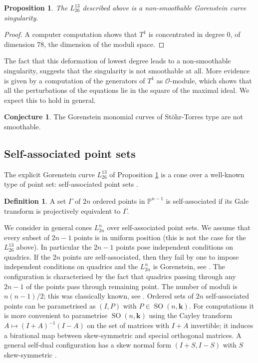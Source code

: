 \documentclass{amsart}
\renewcommand{\P}{\mathbb{P}}
\renewcommand{\k}{\mathbf{k}} %
\newcommand{\mO}{\mathcal{O}}
\newtheorem{prop}[thm]{Proposition}
\theoremstyle{definition}
\newtheorem{defn}[thm]{Definition}
\newtheorem{conj}[thm]{Conjecture}
\theoremstyle{remark}
\begin{document}
\begin{prop}\label{prop:goren}
The $L_{26}^{13}$ described above is a non-smoothable Gorenstein curve singularity.
\end{prop}
\begin{proof}
A computer computation shows that $T^1$ is concentrated in degree 0, of dimension $78$, the dimension of the moduli space.
\end{proof}

The fact  that this deformation of lowest degree 
leads to a non-smoothable singularity, suggests that 
the singularity is not smoothable at all. More evidence is given by a computation of 
the generators of $T^1$ as $\mO$-module, which  shows that
all the perturbations of the equations lie in the square of the maximal ideal. 
We expect this to hold in general.

\begin{conj} 
The Gorenstein monomial curves of Stöhr-Torres type are not smoothable. 
\end{conj}


\subsection{Self-associated point sets}
The explicit Gorenstein curve $L_{26}^{13}$ of Proposition \ref{prop:goren}
is a cone over a well-known type of
 point set: self-associated point sets \cite{Co}. %

\begin{defn} 
A set $\Gamma$ of $2n$ ordered points in $\P^{n-1}$ is self-associated 
if its Gale transform is projectively equivalent to $\Gamma$.
\end{defn}

We consider in general   cones $L_{2n}^n$  over   self-associated point sets.
We assume that every subset of $2n-1$ points is in uniform position (this is not the case
for the $L_{26}^{13}$ above). In particular
 the $2n-1$ points pose independent conditions on quadrics.
If the $2n$ points are self-associated, then they  fail  by one to impose
independent conditions on quadrics and the $L_{2n}^n$
is Gorenstein, see \cite[Sect. 7]{EP}.
The configuration is characterised
by the fact that quadrics passing through any $2n-1$ of the points pass through remaining point.
The number of moduli is $n(n-1)/2$; this was classically known, see \cite[Cor. 8.4]{EP}. 
Ordered sets of $2n$  self-associated points can be parametrised as $(I,P)$ with 
$P\in \operatorname{SO}(n,\k)$. For computations it is more convenient to parametrise 
$ \operatorname{SO}(n,\k)$ using the Cayley transform $A\mapsto (I+A)^{-1}(I-A)$ on the
set of matrices with $I+A$ invertible; it induces a birational map between skew-symmetric and special orthogonal matrices. A general self-dual configuration has a skew normal form
$(I+S,I-S)$ with $S$ skew-symmetric \cite[Thm. 2.9]{BK}.
\end{document}

